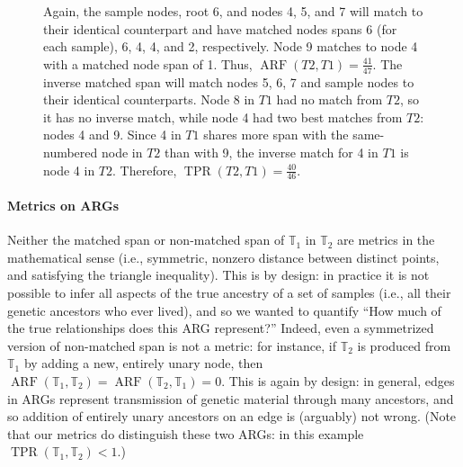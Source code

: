 \documentclass[10pt,twoside,lineno]{gsajnl}
\newcommand{\T}{\mathbb{T}}
\newcommand{\arf}{\operatorname{ARF}}
\newcommand{\tpr}{\operatorname{TPR}}
\begin{document}
\begin{figure}[!ht]
\begin{center}
{        Again, the sample nodes, root 6, and nodes 4, 5, and 7 will match to their identical counterpart
        and have matched nodes spans 6 (for each sample), 6, 4, 4, and 2, respectively.
        Node 9 matches to node 4 with a matched node span of 1.
        Thus, $\operatorname{ARF}(T2,T1)=\frac{41}{47}$. 
        The inverse matched span will match nodes 5, 6, 7 and sample nodes to their identical counterparts. 
        Node 8 in $T1$ had no match from $T2$, so it has no inverse match, while
        node 4 had two best matches from $T2$: nodes 4 and 9.
        Since 4 in $T1$ shares more span with the same-numbered node in $T2$ than with 9,
        the inverse match for 4 in $T1$ is node 4 in $T2$. Therefore,
        $\operatorname{TPR}(T2,T1)=\frac{40}{46}$. 
        \label{fig:conceptual_discrepancy}
    }
	\end{center}
\end{figure}


\paragraph{Metrics on ARGs} 
Neither the matched span or non-matched span of $\T_1$ in $\T_2$ are metrics in the mathematical sense
(i.e., symmetric, nonzero distance between distinct points, and satisfying the triangle inequality).
This is by design: in practice it is not possible to infer all aspects
of the true ancestry of a set of samples (i.e., all their genetic ancestors who ever lived),
and so we wanted to quantify
``How much of the true relationships does this ARG represent?''
Indeed, even a symmetrized version of non-matched span is not a metric:
for instance, if $\T_2$ is produced from $\T_1$ by adding a new, entirely unary node,
then $\arf(\T_1,\T_2) = \arf(\T_2,\T_1) = 0$.
This is again by design: in general, edges in ARGs represent transmission of genetic material
through many ancestors, and so addition of entirely unary ancestors on an edge
is (arguably) not wrong.
(Note that our metrics do distinguish these two ARGs: in this example $\tpr(\T_1,\T_2) < 1$.)
\end{document}
